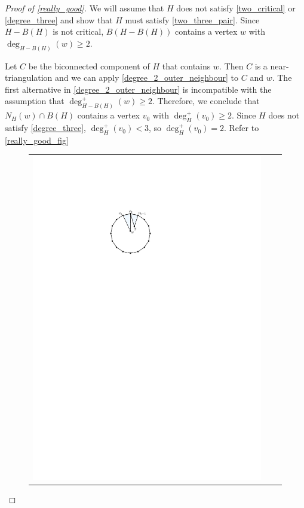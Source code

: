 \documentclass[a4paper,UKenglish,cleveref, autoref, thm-restate]{lipics-v2021}
\begin{document}
\begin{proof}[Proof of \cref{really_good}]
  We will assume that $H$ does not satisfy \cref{two_critical} or \cref{degree_three} and show that $H$ must satisfy \cref{two_three_pair}.  Since $H-B(H)$ is not critical, $B(H-B(H))$ contains a vertex $w$ with $\deg_{H-B(H)}(w)\ge 2$.

  Let $C$ be the biconnected component of $H$ that contains $w$.  Then $C$ is a near-triangulation and we can apply \cref{degree_2_outer_neighbour} to $C$ and $w$. The first alternative in \cref{degree_2_outer_neighbour} is incompatible with the assumption that $\deg^+_{H-B(H)}(w)\ge 2$.  Therefore, we conclude that $N_H(w)\cap B(H)$ contains a vertex $v_0$ with $\deg^+_H(v_0)\ge 2$.  Since $H$ does not satisfy \cref{degree_three}, $\deg^+_H(v_0)< 3$, so $\deg^+_H(v_0)=2$.  Refer to \cref{really_good_fig}
  \begin{figure}
    \centering
    \begin{tabular}{ccc}
      \includegraphics[page=1]{figs/really_good} &

\end{tabular}
\end{figure}
\end{proof}
\end{document}
